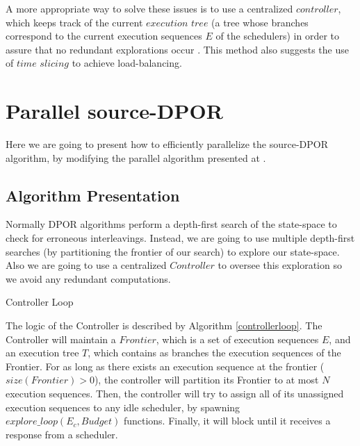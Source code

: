 A more appropriate way to solve these issues is to use a centralized $controller$, which keeps track of the current 
$execution$ $tree$ (a tree whose branches correspond to the current execution sequences $E$ of the schedulers) in order
to assure that no redundant explorations occur \cite{Simsa2012ScalableDP}. This method also suggests the use of
$time$ $slicing$ to achieve load-balancing. 

\section{Parallel source-DPOR}

Here we are going to present how to efficiently parallelize the source-DPOR algorithm, by modifying the parallel algorithm 
presented at \cite{Simsa2012ScalableDP}.

\subsection{Algorithm Presentation}

Normally DPOR algorithms perform a depth-first search of the state-space to check for erroneous interleavings. Instead, we
are going to use multiple depth-first searches (by partitioning the frontier of our search) to explore our state-space.
Also we are going to use a centralized $Controller$ to oversee this exploration so we avoid any redundant computations.

\begin{algorithm}
    \caption{Controller Loop}
    \label{controllerloop}

\end{algorithm}

The logic of the Controller is described by Algorithm \ref{controllerloop}. The Controller will maintain a $Frontier$, 
which is a set of execution sequences $E$, and an execution tree $T$, which contains
as branches the execution sequences of the Frontier. For as long as there exists an execution sequence at the frontier 
($size(Frontier)>0$), the controller will partition its Frontier to at most $N$ execution sequences. Then, the controller
will try to assign all of its unassigned execution sequences to any idle scheduler, by spawning $explore\_loop(E_c, Budget)$
functions. Finally, it will block until it receives a response from a scheduler.


